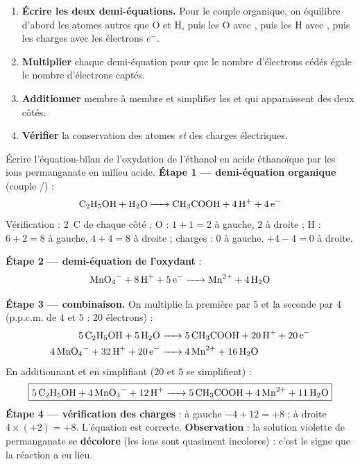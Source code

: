 \documentclass[11pt]{article}
\begin{document}
\begin{methode}
\begin{enumerate}
\item \textbf{Écrire les deux demi-équations.} Pour le couple organique, on équilibre d'abord les atomes autres que O et H, puis les O avec , puis les H avec , puis les charges avec les électrons $e^-$.
\item \textbf{Multiplier} chaque demi-équation pour que le nombre d'électrons cédés égale le nombre d'électrons captés.
\item \textbf{Additionner} membre à membre et simplifier les  et  qui apparaissent des deux côtés.
\item \textbf{Vérifier} la conservation des atomes \emph{et} des charges électriques.
\end{enumerate}
\end{methode}

\begin{exoresolu}
Écrire l'équation-bilan de l'oxydation de l'éthanol en acide éthanoïque par les ions permanganate en milieu acide.
\tcblower
\textbf{Étape 1 — demi-équation organique} (couple /) :
\[ \ce{C2H5OH + H2O -> CH3COOH + 4 H+ + 4 e-} \]
Vérification : $2$~C de chaque côté ; O : $1+1=2$ à gauche, $2$ à droite ; H : $6+2=8$ à gauche, $4+4=8$ à droite ; charges : $0$ à gauche, $+4-4=0$ à droite.

\textbf{Étape 2 — demi-équation de l'oxydant} :
\[ \ce{MnO4- + 8 H+ + 5 e- -> Mn^2+ + 4 H2O} \]

\textbf{Étape 3 — combinaison.} On multiplie la première par $5$ et la seconde par $4$ (p.p.c.m. de $4$ et $5$ : $20$ électrons) :
\begin{align*}
\ce{5 C2H5OH + 5 H2O &-> 5 CH3COOH + 20 H+ + 20 e-}\\
\ce{4 MnO4- + 32 H+ + 20 e- &-> 4 Mn^2+ + 16 H2O}
\end{align*}
En additionnant et en simplifiant ($20$  et $5$  se simplifient) :
\[ \boxed{\ce{5 C2H5OH + 4 MnO4- + 12 H+ -> 5 CH3COOH + 4 Mn^2+ + 11 H2O}} \]
\textbf{Étape 4 — vérification des charges} : à gauche $-4 + 12 = +8$ ; à droite $4 \times (+2) = +8$. L'équation est correcte. \textbf{Observation} : la solution violette de permanganate se \textbf{décolore} (les ions  sont quasiment incolores) : c'est le signe que la réaction a eu lieu.
\end{exoresolu}
\end{document}
